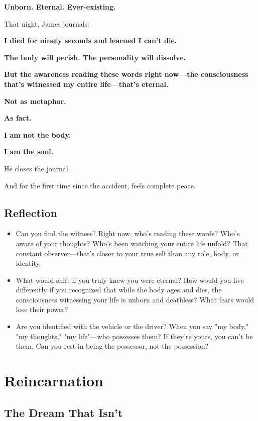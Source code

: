 \documentclass[11pt,twoside]{book}
\begin{document}
\textbf{Unborn. Eternal. Ever-existing.}

That night, James journals:

\textbf{I died for ninety seconds and learned I can't die.}

\textbf{The body will perish. The personality will dissolve.}

\textbf{But the awareness reading these words right now—the consciousness that's witnessed my entire life—that's eternal.}

\textbf{Not as metaphor.}

\textbf{As fact.}

\textbf{I am not the body.}

\textbf{I am the soul.}

He closes the journal.

And for the first time since the accident, feels complete peace.

\section*{Reflection}

\begin{itemize}
\item Can you find the witness? Right now, who's reading these words? Who's aware of your thoughts? Who's been watching your entire life unfold? That constant observer—that's closer to your true self than any role, body, or identity.
\item What would shift if you truly knew you were eternal? How would you live differently if you recognized that while the body ages and dies, the consciousness witnessing your life is unborn and deathless? What fears would lose their power?
\item Are you identified with the vehicle or the driver? When you say "my body," "my thoughts," "my life"—who possesses them? If they're yours, you can't be them. Can you rest in being the possessor, not the possession?
\end{itemize}

\chapter{Reincarnation}

\section*{The Dream That Isn't}
\end{document}
